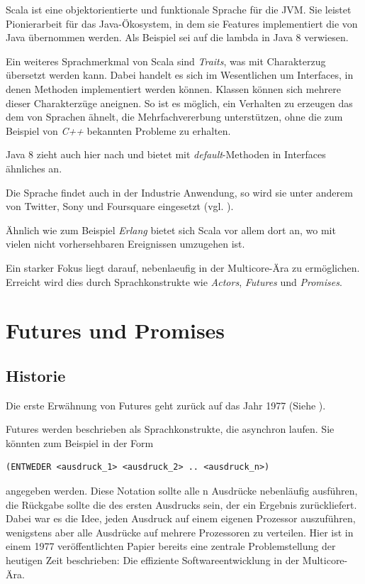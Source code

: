 \documentclass[11pt,a4paper,titlepage,ngerman]{scrartcl}
\begin{document}
Scala ist eine objektorientierte und funktionale Sprache für die JVM. Sie
leistet Pionierarbeit für das Java-Ökosystem, in dem sie Features implementiert
die von Java übernommen werden. Als Beispiel sei auf die \gls{lambda} in
Java 8 verwiesen.

Ein weiteres Sprachmerkmal von Scala sind \emph{Traits}, was mit 
\glqq Charakterzug\grqq{} übersetzt werden kann. Dabei handelt es sich im
Wesentlichen um Interfaces, in denen Methoden implementiert werden können.
Klassen können sich mehrere dieser \glqq Charakterzüge\grqq{} aneignen.
So ist es möglich, ein Verhalten zu erzeugen das dem von Sprachen ähnelt, die
Mehrfachvererbung unterstützen, ohne die zum Beispiel von \emph{C++} bekannten
Probleme zu erhalten.

Java 8 zieht auch hier nach und bietet mit \emph{default}-Methoden in Interfaces
ähnliches an.

Die Sprache findet auch in der Industrie Anwendung, so wird sie unter anderem von Twitter,
Sony und Foursquare eingesetzt (vgl. \cite{scalaInEnterprise}).

Ähnlich wie zum Beispiel \emph{Erlang} bietet sich Scala vor allem dort an,
wo mit vielen nicht vorhersehbaren Ereignissen umzugehen ist.

Ein starker Fokus liegt darauf, \gls{nebenlaeufig} in der Multicore-Ära
zu ermöglichen. Erreicht wird dies durch Sprachkonstrukte wie \emph{Actors},
\emph{Futures} und \emph{Promises}.


\section{Futures und Promises}

\subsection{Historie}

Die erste Erwähnung von Futures geht zurück auf das Jahr 1977 
(Siehe \cite{Baker:1977:IGC:872734.806932}).

Futures werden beschrieben als Sprachkonstrukte, die asynchron laufen. Sie 
könnten zum Beispiel in der Form 
\begin{lstlisting}
(ENTWEDER <ausdruck_1> <ausdruck_2> .. <ausdruck_n>)
\end{lstlisting}
angegeben werden. Diese Notation sollte alle n Ausdrücke nebenläufig ausführen, 
die Rückgabe sollte die des ersten Ausdrucks sein, der ein Ergebnis zurückliefert.
Dabei war es die Idee, jeden Ausdruck auf einem eigenen Prozessor auszuführen, 
wenigstens aber alle Ausdrücke auf mehrere Prozessoren zu verteilen. Hier ist in 
einem 1977 veröffentlichten Papier bereits eine zentrale Problemstellung der 
heutigen Zeit beschrieben: Die effiziente Softwareentwicklung in der Multicore-Ära.
\end{document}
